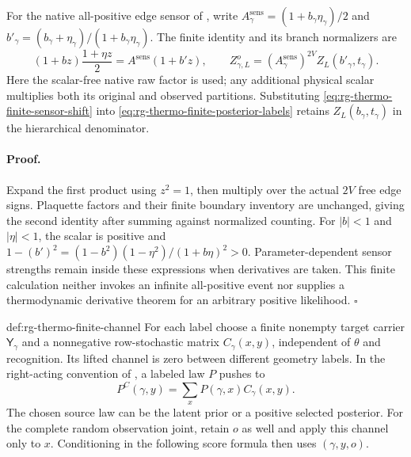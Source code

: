 For the native all-positive edge sensor of
, write
$A_\gamma^{\mathrm{sens}}=(1+b_\gamma\eta_\gamma)/2$ and
$b'_\gamma=(b_\gamma+\eta_\gamma)/(1+b_\gamma\eta_\gamma)$.
The finite identity and its branch normalizers are
\begin{equation}
 (1+bz)\frac{1+\eta z}{2}
 =A^{\mathrm{sens}}(1+b'z),
 \qquad
 Z_{\gamma,L}^o=(A_\gamma^{\mathrm{sens}})^{2V}
                          Z_L(b'_\gamma,t_\gamma).
 \label{eq:rg-thermo-finite-sensor-shift}
\end{equation}
Here the scalar-free native raw factor is used; any additional physical
scalar multiplies both its original and observed partitions. Substituting
\cref{eq:rg-thermo-finite-sensor-shift} into
\cref{eq:rg-thermo-finite-posterior-labels} retains
$Z_L(b_\gamma,t_\gamma)$ in the hierarchical denominator.\thermoestablishedstatus


\paragraph{Proof.}
Expand the first product using $z^2=1$, then multiply over the actual
$2V$ free edge signs. Plaquette factors and their finite boundary inventory
are unchanged, giving the second identity after summing against normalized
counting. For $|b|<1$ and $|\eta|<1$, the scalar is positive and
$1-(b')^2=(1-b^2)(1-\eta^2)/(1+b\eta)^2>0$. Parameter-dependent sensor
strengths remain inside these expressions when derivatives are taken.
This finite calculation neither invokes an infinite all-positive event
nor supplies a thermodynamic derivative theorem for an arbitrary positive
likelihood. $\square$

{def:rg-thermo-finite-channel}
For each label choose a finite nonempty target carrier
$\mathsf Y_\gamma$ and a nonnegative row-stochastic matrix
$C_\gamma(x,y)$, independent of $\theta$ and recognition. Its lifted
channel is zero between different geometry labels. In the right-acting
convention of , a labeled law $P$ pushes to
\begin{equation}
 P^C(\gamma,y)=\sum_xP(\gamma,x)C_\gamma(x,y).
 \label{eq:rg-thermo-finite-channel}
\end{equation}
The chosen source law can be the latent prior or a positive selected
posterior. For the complete random observation joint, retain $o$ as well
and apply this channel only to $x$. Conditioning in the following score
formula then uses $(\gamma,y,o)$. 

